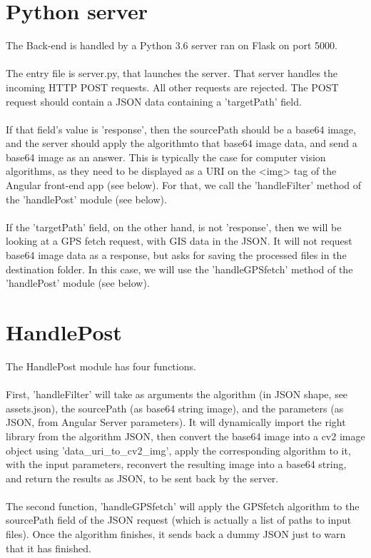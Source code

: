 \documentclass[12pt,a4paper]{article}
\begin{document}
\section{Python server}
The Back-end is handled by a Python 3.6 server ran on Flask on port 5000.\\
~\\
The entry file is server.py, that launches the server. That server handles the incoming HTTP POST requests. All other requests are rejected. The POST request should contain a JSON data containing a 'targetPath' field.\\
~\\
If that field's value is 'response', then the sourcePath should be a base64 image, and the server should apply the algorithmto that base64 image data, and send a base64 image as an answer. This is typically the case for computer vision algorithms, as they need to be displayed as a URI on the <img> tag of the Angular front-end app (see below). For that, we call the 'handleFilter' method of the 'handlePost' module (see below).\\
~\\
If the 'targetPath' field, on the other hand, is not 'response', then we will be looking at a GPS fetch request, with GIS data in the JSON. It will not request base64 image data as a response, but asks for saving the processed files in the destination folder. In this case, we will use the 'handleGPSfetch' method of the 'handlePost' module (see below).

\section{HandlePost}
The HandlePost module has four functions.\\
~\\
First, 'handleFilter' will take as arguments the algorithm (in JSON shape, see assets.json), the sourcePath (as base64 string image), and the parameters (as JSON, from Angular Server parameters). It will dynamically import the right library from the algorithm JSON, then convert the base64 image into a cv2 image object using 'data\_uri\_to\_cv2\_img', apply the corresponding algorithm to it, with the input parameters, reconvert the resulting image into a base64 string, and return the results as JSON, to be sent back by the server.\\
~\\
The second function, 'handleGPSfetch' will apply the GPSfetch algorithm to the sourcePath field of the JSON request (which is actually a list of paths to input files). Once the algorithm finishes, it sends back a dummy JSON just to warn that it has finished.
\end{document}
